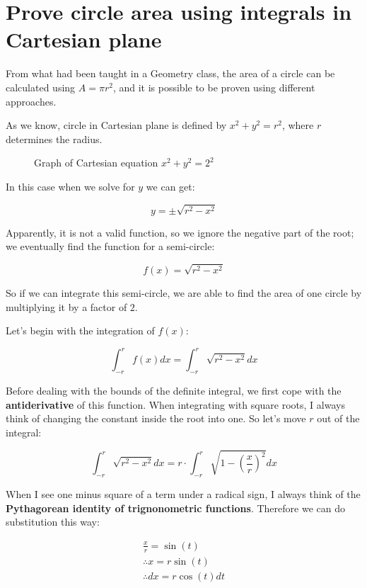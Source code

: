 \section{Prove circle area using integrals in Cartesian plane}
From what had been taught in a Geometry class, the area of a circle can be
calculated using $A=\pi r^2$, and it is possible to be proven using different
approaches.

As we know, circle in Cartesian plane is defined by $x^2+y^2=r^2$, where $r$
determines the radius.

\begin{figure}[H]
	\caption{Graph of Cartesian equation $x^2+y^2=2^2$}
	\label{circ}
\end{figure}

In this case when we solve for $y$ we can get:

$$y=\pm \sqrt{r^2-x^2}$$

Apparently, it is not a valid function, so we ignore the negative part of the
root; we eventually find the function for a semi-circle:

$$f(x)=\sqrt{r^2-x^2}$$

So if we can integrate this semi-circle, we are able to find the area of one
circle by multiplying it by a factor of $2$.

Let's begin with the integration of $f(x)$:

$$\int_{-r}^r f(x)dx=\int_{-r}^r \sqrt{r^2-x^2}dx$$

Before dealing with the bounds of the definite integral, we first cope with the
\textbf{antiderivative} of this function. When integrating with square roots, I
always think of changing the constant inside the root into one. So let's move
$r$ out of the integral:

$$\int_{-r}^r\sqrt{r^2-x^2}dx=r\cdot\int_{-r}^r\sqrt{1-(\frac{x}r)^2}dx$$

When I see one minus square of a term under a radical sign, I always think of
the \textbf{Pythagorean identity of trignonometric functions}. Therefore we can
do substitution this way:

$$
\begin{aligned}
	\frac{x}r=\sin(t) \\
	\therefore x=r\sin(t) \\
	\therefore dx=r\cos(t)dt
\end{aligned}
$$

